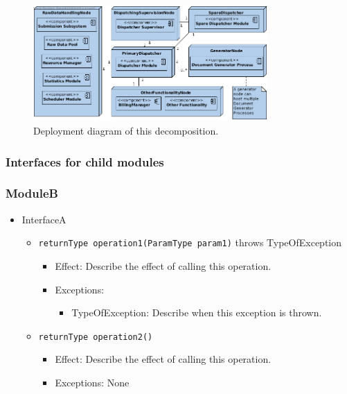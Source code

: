 \documentclass[a4paper,10pt]{article}
\begin{document}
\begin{figure}[!htp]
    \centering
    \includegraphics[width=0.8\textwidth]{depl_diag_1.png}
    \caption{Deployment diagram of this decomposition.}\label{fig:it1-depl_main}
\end{figure}

\subsubsection{Interfaces for child modules}
\subsubsection*{ModuleB}
\begin{itemize}
    \item InterfaceA
    \begin{itemize}
        \item \texttt{returnType operation1(ParamType param1)} throws TypeOfException
        \begin{itemize}
            \item Effect: Describe the effect of calling this operation.
            \item Exceptions:
            \begin{itemize}
                \item TypeOfException: Describe when this exception is thrown.
            \end{itemize}
        \end{itemize}

        \item \texttt{returnType operation2()}
        \begin{itemize}
            \item Effect: Describe the effect of calling this operation.
            \item Exceptions: None
         \end{itemize}
    \end{itemize}
\end{itemize}
\end{document}
